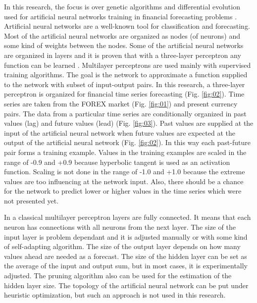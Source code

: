 \documentclass[graybox]{svmult}
\begin{document}
In this research, the focus is over genetic algorithms and differential evolution used for artificial neural networks training in financial forecasting problems \cite{money-bee-01,genetic-algorithms-01}. Artificial neural networks are a well-known tool for classification and forecasting. Most of the artificial neural networks are organized as nodes (of neurons) and some kind of weights between the nodes. Some of the artificial neural networks are organized in layers and it is proven that with a three-layer perceptron any function can be learned \cite{three-layer-perceptron-01}. Multilayer perceptrons are used mainly with supervised training algorithms. The goal is the network to approximate a function supplied to the network with subset of input-output pairs. In this research, a three-layer perceptron is organized for financial time series \cite{time-series-01,time-series-02,time-series-03} forecasting (Fig. \ref{fig:02}). Time series are taken from the FOREX market (Fig. \ref{fig:01}) and present currency pairs. The data from a particular time series are conditionally organized in past values (lag) and future values (lead) (Fig. \ref{fig:03}). Past values are supplied at the input of the artificial neural network when future values are expected at the output of the artificial neural network (Fig. \ref{fig:02}). In this way each past-future pair forms a training example. Values in the training examples are scaled in the range of -0.9 and +0.9 because hyperbolic tangent is used as an activation function. Scaling is not done in the range of -1.0 and +1.0 because the extreme values are too influencing at the network input. Also, there should be a chance for the network to predict lower or higher values in the time series which were not presented yet. 

In a classical multilayer perceptron layers are fully connected. It means that each neuron has connections with all neurons from the next layer. The size of the input layer is problem dependant and it is adjusted manually or with some kind of self-adapting algorithm. The size of the output layer depends on how many values ahead are needed as a forecast. The size of the hidden layer can be set as the average of the input and output sum, but in most cases, it is experimentally adjusted. The pruning algorithm also can be used for the estimation of the hidden layer size. The topology of the artificial neural network can be put under heuristic optimization, but such an approach is not used in this research. 
\end{document}
